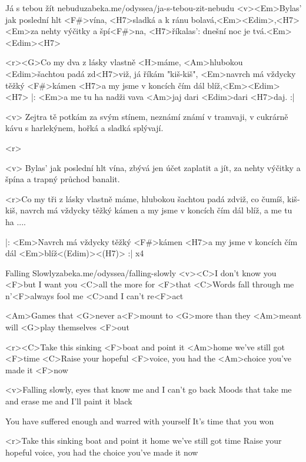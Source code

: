 \begin{song}[Nerez]{59}{Já s tebou žít nebudu}{zabeka.me/odyssea/ja-s-tebou-zit-nebudu}
<v><Em>Bylas' jak poslední hlt <F#>vína,
<H7>sladká a k ránu bolavá,<Em><Edim>,<H7>
<Em>za nehty výčitky a špí<F#>na,
<H7>říkalas': dnešní noc je tvá.<Em><Edim><H7> 

<r><G>Co my dva z lásky vlastně <H>máme,
<Am>hlubokou <Edim>šachtou padá zd<H7>viž, já říkám "kiš-kiš",
<Em>navrch má vždycky těžký <F#>kámen
<H7>a my jsme v koncích čím dál blíž,<Em><Edim><H7>
|: <Em>a me tu ha nadži vava <Am>jaj dari <Edim>dari <H7>daj. :|

<v> Zejtra tě potkám za svým stínem,
neznámí známí v tramvaji,
v cukrárně kávu s harlekýnem,
hořká a sladká splývají.

<r>

<v> Bylas' jak poslední hlt vína,
zbývá jen účet zaplatit a jít,
za nehty výčitky a špína
a trapný průchod banalit.

<r>Co my tři z lásky vlastně máme,
hlubokou šachtou padá zdviž, co čumíš, kiš-kiš,
navrch má vždycky těžký kámen
a my jsme v koncích čím dál blíž,
a me tu ha ....

|: <Em>Navrch má vždycky těžký <F#>kámen
<H7>a my jsme v koncích čím dál <Em>blíž<(Edim)><(H7)> :| x4

\end{song}
\begin{song}{60}{Falling Slowly}{zabeka.me/odyssea/falling-slowly}
<v><C>I don't know you <F>but I want you
<C>all the more for <F>that
<C>Words fall through me n'<F>always fool me
<C>and I can't re<F>act

<Am>Games that <G>never a<F>mount
to <G>more than they <Am>meant
will <G>play themselves <F>out

<r><C>Take this sinking <F>boat and point it <Am>home
we've still got <F>time
<C>Raise your hopeful <F>voice, you had the <Am>choice
you've made it <F>now

<v>Falling slowly, eyes that know me
and I can't go back
Moods that take me and erase me
and I'll paint it black

You have suffered enough
and warred with yourself
It's time that you won

<r>Take this sinking boat and point it home
we've still got time
Raise your hopeful voice, you had the choice
you've made it now

\end{song}
